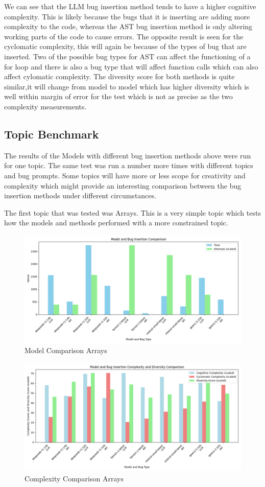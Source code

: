 \documentclass[12pt]{extarticle}
\begin{document}
We can see that the LLM bug insertion method tends to have a higher cognitive complexity. This is likely because the bugs that it is inserting are adding more complexity to the code, whereas the AST bug insertion method is only altering working parts of the code to cause errors. The opposite result is seen for the cyclomatic complexity, this will again be because of the types of bug that are inserted. Two of the possible bug types for AST can affect the functioning of a for loop and there is also a bug type that will affect function calls which can also affect cylomatic complexity. The diversity score for both methods is quite similar,it will change from model to model which has higher diversity which is well within margin of error for the test which is not as precise as the two complexity measurements.

\subsection{Topic Benchmark}

The results of the Models with different bug insertion methods above were run for one topic. The same test was run a number more times with different topics and bug prompts. Some topics will have more or less scope for creativity and complexity which might provide an interesting comparison between the bug insertion methods under different circumstances.

The first topic that was tested was Arrays. This is a very simple topic which tests how the models and methods performed with a more constrained topic.

\begin{figure}[h!]
\centering
\includegraphics[width=0.8\linewidth]{Images/Model_Comparison_Arrays.png}
\caption{Model Comparison Arrays}
\label{fig:Model_Comparison_Arrays}
\end{figure}

\begin{figure}[h!]
\centering
\includegraphics[width=0.8\linewidth]{Images/Complexity_Comparison_Arrays.png}
\caption{Complexity Comparison Arrays}
\label{fig:Complexity_Comparison_Arrays}
\end{figure}
\end{document}
